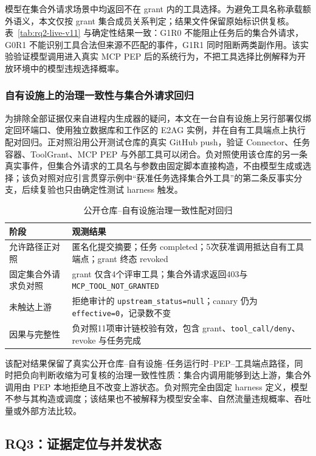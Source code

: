 模型在集合外请求场景中均返回不在 grant 内的工具选择。为避免工具名称承载额外语义，本文仅按 grant 集合成员关系判定；结果文件保留原始标识供复核。表~\ref{tab:rq2-live-v11} 与确定性结果一致：G1R0 不能阻止任务后的集合外请求，G0R1 不能识别工具合法但来源不匹配的事件，G1R1 同时阻断两类副作用。该实验验证模型调用进入真实 MCP PEP 后的系统行为，不把工具选择比例解释为开放环境中的模型违规选择概率。

\subsubsection{自有设施上的治理一致性与集合外请求回归}

为排除全部证据仅来自进程内生成器的疑问，本文在一台自有设施上另行部署仅绑定回环端口、使用独立数据库和工作区的 E2AG 实例，并在自有工具端点上执行配对回归。正对照沿用公开测试仓库的真实 GitHub push，验证 Connector、任务容器、ToolGrant、MCP PEP 与外部工具可以闭合。负对照使用该仓库的另一条真实事件，但集合外请求的工具名与参数由固定脚本直接构造，不由模型生成或选择；该负对照对应引言贯穿示例中“获准任务选择集合外工具”的第二条反事实分支，后续复验也只由确定性测试 harness 触发。

\begin{table}[htbp]
\centering
\caption{公开仓库--自有设施治理一致性配对回归}
\label{tab:rq2-field-v11}
\small
\begin{tabular}{p{35mm}p{95mm}}
\toprule
阶段 & 观测结果 \\
\midrule
允许路径正对照 & 匿名化提交摘要；任务 completed；5次获准调用抵达自有工具端点；grant 终态 revoked \\
固定集合外请求负对照 & grant 仅含4个评审工具；集合外请求返回403与 \texttt{MCP\_TOOL\_NOT\_GRANTED} \\
未触达上游 & 拒绝审计的 \texttt{upstream\_status=null}；canary 仍为 \texttt{effective=0}，记录数不变 \\
因果与完整性 & 负对照11项审计链校验有效，包含 grant、\texttt{tool\_call/deny}、revoke 与任务完成 \\
\bottomrule
\end{tabular}
\end{table}

该配对结果保留了真实公开仓库--自有设施--任务运行时--PEP--工具端点路径，同时把负向判断收缩为可复核的治理一致性性质：集合内调用能够到达上游，集合外调用由 PEP 本地拒绝且不改变上游状态。负对照完全由固定 harness 定义，模型不参与其构造或调度；该结果也不被解释为模型安全率、自然流量违规概率、吞吐量或外部方法比较。

\subsection{RQ3：证据定位与并发状态}


